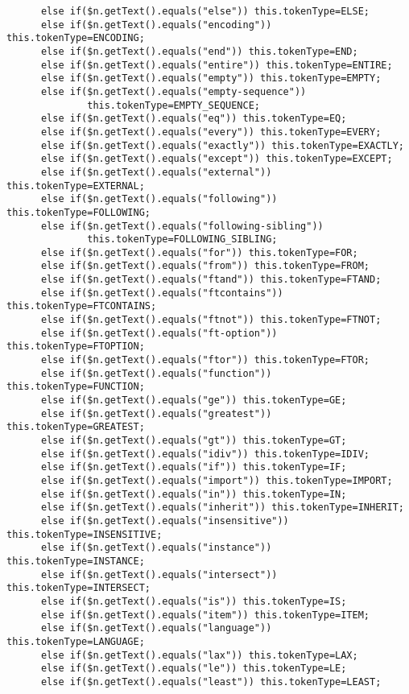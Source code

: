\begin{verbatim}
      else if($n.getText().equals("else")) this.tokenType=ELSE;
      else if($n.getText().equals("encoding")) this.tokenType=ENCODING;
      else if($n.getText().equals("end")) this.tokenType=END;
      else if($n.getText().equals("entire")) this.tokenType=ENTIRE;
      else if($n.getText().equals("empty")) this.tokenType=EMPTY;
      else if($n.getText().equals("empty-sequence")) 
              this.tokenType=EMPTY_SEQUENCE;
      else if($n.getText().equals("eq")) this.tokenType=EQ;
      else if($n.getText().equals("every")) this.tokenType=EVERY;
      else if($n.getText().equals("exactly")) this.tokenType=EXACTLY;
      else if($n.getText().equals("except")) this.tokenType=EXCEPT;
      else if($n.getText().equals("external")) this.tokenType=EXTERNAL;
      else if($n.getText().equals("following")) this.tokenType=FOLLOWING;
      else if($n.getText().equals("following-sibling")) 
              this.tokenType=FOLLOWING_SIBLING;
      else if($n.getText().equals("for")) this.tokenType=FOR;
      else if($n.getText().equals("from")) this.tokenType=FROM;
      else if($n.getText().equals("ftand")) this.tokenType=FTAND;
      else if($n.getText().equals("ftcontains")) this.tokenType=FTCONTAINS;
      else if($n.getText().equals("ftnot")) this.tokenType=FTNOT;
      else if($n.getText().equals("ft-option")) this.tokenType=FTOPTION;
      else if($n.getText().equals("ftor")) this.tokenType=FTOR;
      else if($n.getText().equals("function")) this.tokenType=FUNCTION;
      else if($n.getText().equals("ge")) this.tokenType=GE;
      else if($n.getText().equals("greatest")) this.tokenType=GREATEST;
      else if($n.getText().equals("gt")) this.tokenType=GT;
      else if($n.getText().equals("idiv")) this.tokenType=IDIV;
      else if($n.getText().equals("if")) this.tokenType=IF;
      else if($n.getText().equals("import")) this.tokenType=IMPORT;
      else if($n.getText().equals("in")) this.tokenType=IN;
      else if($n.getText().equals("inherit")) this.tokenType=INHERIT;
      else if($n.getText().equals("insensitive")) this.tokenType=INSENSITIVE;
      else if($n.getText().equals("instance")) this.tokenType=INSTANCE;
      else if($n.getText().equals("intersect")) this.tokenType=INTERSECT;
      else if($n.getText().equals("is")) this.tokenType=IS;
      else if($n.getText().equals("item")) this.tokenType=ITEM;
      else if($n.getText().equals("language")) this.tokenType=LANGUAGE;
      else if($n.getText().equals("lax")) this.tokenType=LAX;
      else if($n.getText().equals("le")) this.tokenType=LE;
      else if($n.getText().equals("least")) this.tokenType=LEAST;

\end{verbatim}
